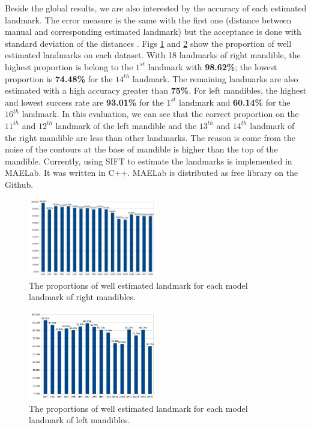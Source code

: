 \documentclass{gretsi}
\begin{document}
Beside the global results, we are also interested by the accuracy of each estimated landmark. The error measure is the same with the first one (distance between manual and corresponding estimated landmark) but the acceptance is done with standard deviation of the distances \cite{bland1996statistics}. Figs \ref{fig7} and \ref{fig8} show the proportion of well estimated landmarks on each dataset. With 18 landmarks of right mandible, the highest proportion is belong to the $1^{st}$ landmark with \textbf{98.62\%}; the lowest proportion is \textbf{74.48\%} for the $14^{th}$ landmark. The remaining landmarks are also estimated with a high accuracy greater than \textbf{75\%}. For left mandibles, the highest and lowest success rate are \textbf{93.01\%} for the $1^{st}$ landmark and \textbf{60.14\%} for the $16^{th}$ landmark. In this evaluation, we can see that the correct proportion on the $11^{th}$ and $12^{th}$ landmark of the left mandible and the $13^{th}$ and $14^{th}$ landmark of the right mandible are less than other landmarks. The reason is come from the noise of the contours at the base of mandible is higher than the top of the mandible. Currently, using SIFT to estimate the landmarks is implemented in MAELab. It was written in C++. MAELab is distributed as free library on the Github.
\begin{figure}[htb]
    \centering
    \includegraphics[width=0.5\textwidth]{./images/md_chartlms}
    \caption{The proportions of well estimated landmark for each model landmark of right mandibles.}
    \label{fig7}
\end{figure}
\begin{figure}[htb]
    \centering
    \includegraphics[width=0.5\textwidth]{./images/mg_chartlms}
    \caption{The proportions of well estimated landmark for each model landmark of left mandibles.}
    \label{fig8}
\end{figure}
\end{document}
